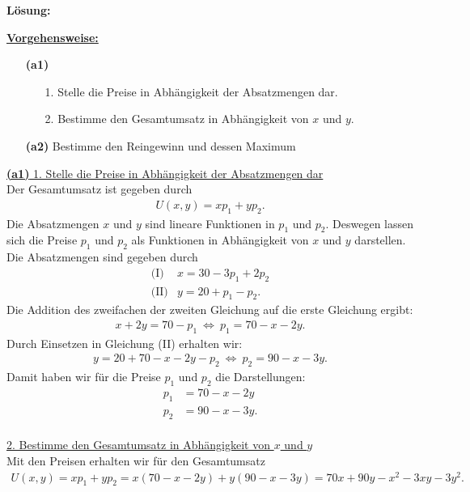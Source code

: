 \textbf{Lösung:}
\begin{mdframed}
\underline{\textbf{Vorgehensweise:}}
\renewcommand{\labelenumi}{\theenumi.}
\begin{enumerate}
\item[\textbf{(a1)}] 
\begin{enumerate}
	\item[1.] Stelle die Preise in Abhängigkeit der Absatzmengen dar.
	\item[2.] Bestimme den Gesamtumsatz in Abhängigkeit von $ x $ und $ y $.
\end{enumerate} 
\item[\textbf{(a2)}] Bestimme den Reingewinn und dessen Maximum
\end{enumerate}
\end{mdframed}
\underline{\textbf{(a1)} 1. Stelle die Preise in Abhängigkeit der Absatzmengen dar}\\
Der Gesamtumsatz ist gegeben durch
\begin{align*}
	U(x,y) = x p_1 + y p_2.
\end{align*}
Die Absatzmengen $ x $ und $ y $ sind lineare Funktionen in $ p_1 $ und $ p_2 $. Deswegen lassen sich die Preise $ p_1 $ und $ p_2 $ als Funktionen in Abhängigkeit von $ x $ und $ y $ darstellen.
Die Absatzmengen sind gegeben durch
\begin{align*}
	\textrm{(I)}&	x = 30 - 3 p_1 + 2 p_2\\
	\textrm{(II)}&  y = 20 + p_1 - p_2 .
\end{align*}
Die Addition des zweifachen der zweiten Gleichung auf die erste Gleichung ergibt:
\begin{align*}
	x + 2y = 70 - p_1
	\ \Leftrightarrow \ 
	p_1 = 70 - x - 2y.
\end{align*}
Durch Einsetzen in Gleichung (II) erhalten wir:
\begin{align*}
	y = 20 + 70 - x - 2y - p_2 
	\ \Leftrightarrow \
	p_2 = 90 -x - 3y.
\end{align*}
Damit haben wir für die Preise $ p_1 $ und $ p_2 $ die Darstellungen:
\begin{align*}
	p_1 &= 70 - x - 2y\\
	p_2 &= 90 -x - 3y.
\end{align*}
\ \\
\underline{2. Bestimme den Gesamtumsatz in Abhängigkeit von $ x $ und $ y $}\\
Mit den Preisen erhalten wir für den Gesamtumsatz
\begin{align*}
	U(x,y) = 
	x p_1 + y p_2 = 
	x (70 - x - 2y) + y (90 -x - 3y)
	=
	70x + 90 y- x^2 - 3 xy - 3 y^2.
\end{align*} 
